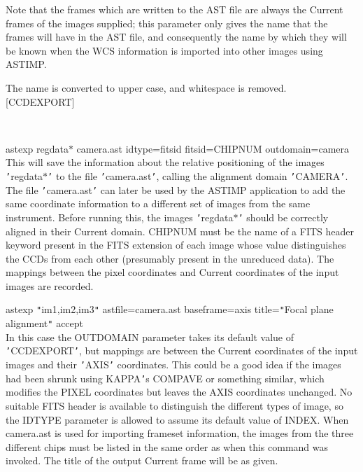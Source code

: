 \documentclass[twoside,11pt]{article}
\renewcommand{\_}{\texttt{\symbol{95}}}
\newcommand{\sstexamples}[1]{
   \item[Examples:] \mbox{} \\
   \vspace{-3.5ex}
   \begin{description}
      #1
   \end{description}
}
\newcommand{\sstexamplesubsection}[2]{\sloppy \item{\ssttt #1} \mbox{} \\ #2 }
\newcommand{\sstexamples}[1]{
      \item[Examples:] \\
      \begin{description}
         #1
      \end{description}
      \\
   }
\newcommand{\sstexamplesubsection}[2]{\item[{\ssttt #1}] #2}
\begin{document}
{{{         Note that the frames which are written to the AST file are
         always the Current frames of the images supplied; this
         parameter only gives the name that the frames will have in
         the AST file, and consequently the name by which they will be
         known when the WCS information is imported into other images
         using ASTIMP.

         The name is converted to upper case, and whitespace is removed.
         [CCD\_EXPORT]
      }
   }
   \sstexamples{
      \sstexamplesubsection{
         astexp reg\_data$*$ camera.ast idtype=fitsid fitsid=CHIPNUM
             outdomain=camera
      }{
         This will save the information about the relative positioning
         of the images {\tt '}reg\_data$*${\tt '} to the file {\tt '}camera.ast{\tt '}, calling the
         alignment domain {\tt '}CAMERA{\tt '}.  The file {\tt '}camera.ast{\tt '} can later be
         used by the ASTIMP application to add the same coordinate
         information to a different set of images from the same instrument.
         Before running this, the images {\tt '}reg\_data$*${\tt '} should be correctly
         aligned in their Current domain.  CHIPNUM must be the name
         of a FITS header keyword present in the FITS extension of each
         image whose value distinguishes the CCDs from each other
         (presumably present in the unreduced data).  The mappings
         between the pixel coordinates and Current coordinates of the
         input images are recorded.
      }
      \sstexamplesubsection{
         astexp {\tt "}im1,im2,im3{\tt "} astfile=camera.ast baseframe=axis
             title={\tt "}Focal plane alignment{\tt "} accept
      }{
         In this case the OUTDOMAIN parameter takes its default value
         of {\tt '}CCD\_EXPORT{\tt '}, but mappings are between the Current
         coordinates of the input images and their {\tt '}AXIS{\tt '} coordinates.
         This could be a good idea if the images had been shrunk using
         KAPPA{\tt '}s COMPAVE or something similar, which modifies the
         PIXEL coordinates but leaves the AXIS coordinates unchanged.
         No suitable FITS header is available to distinguish the
         different types of image, so the IDTYPE parameter is allowed to
         assume its default value of INDEX.  When camera.ast is used
         for importing frameset information, the images from the three
         different chips must be listed in the same order as when this
         command was invoked.  The title of the output Current frame
         will be as given.
}}}
\end{document}
